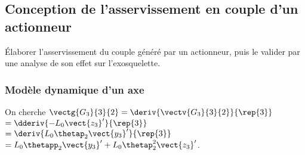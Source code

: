 \subsection{Conception de l'asservissement en couple d'un actionneur}
\ifprof
\else
\begin{obj}
{Élaborer l'asservissement du couple généré par un actionneur, puis le valider par une analyse de son effet sur l'exosquelette.}
\end{obj}
\fi

\subsubsection{Modèle dynamique d'un axe}


\ifprof\begin{corrige}
On cherche $\vectg{G_3}{3}{2} = \deriv{\vectv{G_3}{3}{2}}{\rep{3}}$ $= \dderiv{-L_0 \vect{z_3}'}{\rep{3}}$
$= \deriv{L_0 \thetap_2 \vect{y_3}'}{\rep{3}}$
$= L_0 \thetapp_2 \vect{y_3}' +L_0 \thetap_2^2 \vect{z_3}' $.

\end{corrige}\else\fi

